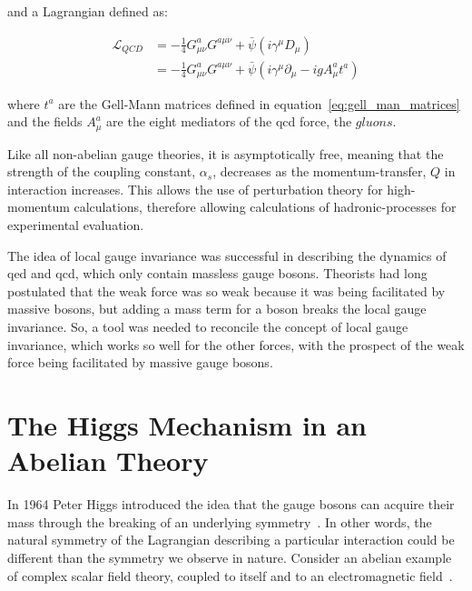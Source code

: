 \noindent and a Lagrangian defined as:

\begin{equation}\label{eq:qcd_lagrangian}
\begin{aligned}
\mathcal{L}_{QCD} & = -\frac{1}{4}G_{\mu\nu}^{a}G^{a\mu\nu} +
\bar{\psi}(i\gamma^{\mu}D_{\mu}) \\
 & = -\frac{1}{4}G_{\mu\nu}^{a}G^{a\mu\nu} +
\bar{\psi}(i\gamma^{\mu}\partial_{\mu}-igA_{\mu}^{a}t^{a})
\end{aligned}
\end{equation}

\noindent where $t^{a}$ are the Gell-Mann matrices defined in
equation~\ref{eq:gell_man_matrices} and the fields $A_{\mu}^{a}$ are
the eight mediators of the \acrshort{qcd} force, the $gluons$.  

\par Like all non-abelian gauge theories, it is asymptotically
free, meaning that the strength of the coupling constant,
$\alpha_{s}$, decreases as the momentum-transfer, $Q$ in interaction
increases.  This allows the use of perturbation theory for
high-momentum calculations, therefore allowing calculations of
hadronic-processes for experimental evaluation.    

\par The idea of local gauge invariance was successful in describing
the dynamics of \acrshort{qed} and \acrshort{qcd}, which only contain
massless gauge bosons. Theorists had long postulated that
the weak force was so weak because it was being facilitated by massive
bosons, but adding a mass term for a boson breaks the local gauge
invariance.  So, a tool was needed to reconcile the concept of local gauge
invariance, which works so well for the other forces, with the
prospect of the weak force being facilitated by massive gauge bosons.


\section{The Higgs Mechanism in an Abelian Theory}
\label{abelian_higgs_mechanism_overview}

\par In 1964 Peter Higgs introduced the idea that the gauge bosons
can acquire their mass through the breaking of an underlying
symmetry~\cite{th:Higgs_BrokenSymmetries}. In other words, the natural
symmetry of the Lagrangian describing a particular interaction could
be different than the symmetry we observe in nature.  Consider an
abelian example of complex scalar field theory, coupled to itself and
to an electromagnetic field~\cite{Peskin_Schroeder}. 

